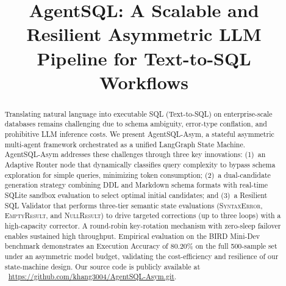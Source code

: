 \documentclass[conference]{IEEEtran}
\begin{document}
\title{AgentSQL: A Scalable and Resilient Asymmetric LLM Pipeline for Text-to-SQL Workflows}

\author{
}

\maketitle

\begin{abstract}
    Translating natural language into executable SQL (Text-to-SQL) on enterprise-scale databases remains challenging due to schema ambiguity, error-type conflation, and prohibitive LLM inference costs. We present AgentSQL-Asym, a stateful asymmetric multi-agent framework orchestrated as a unified LangGraph State Machine. AgentSQL-Asym addresses these challenges through three key innovations: (1)~an Adaptive Router node that dynamically classifies query complexity to bypass schema exploration for simple queries, minimizing token consumption; (2)~a dual-candidate generation strategy combining DDL and Markdown schema formats with real-time SQLite sandbox evaluation to select optimal initial candidates; and (3)~a Resilient SQL Validator that performs three-tier semantic state evaluations (\textsc{SyntaxError}, \textsc{EmptyResult}, and \textsc{NullResult}) to drive targeted corrections (up to three loops) with a high-capacity corrector. A round-robin key-rotation mechanism with zero-sleep failover enables sustained high throughput. Empirical evaluation on the BIRD Mini-Dev benchmark demonstrates an Execution Accuracy of 80.20\% on the full 500-sample set under an asymmetric model budget, validating the cost-efficiency and resilience of our state-machine design. Our source code is publicly available at \faGithub\ \url{https://github.com/khang3004/AgentSQL-Asym.git}.
\end{abstract}
\end{document}
